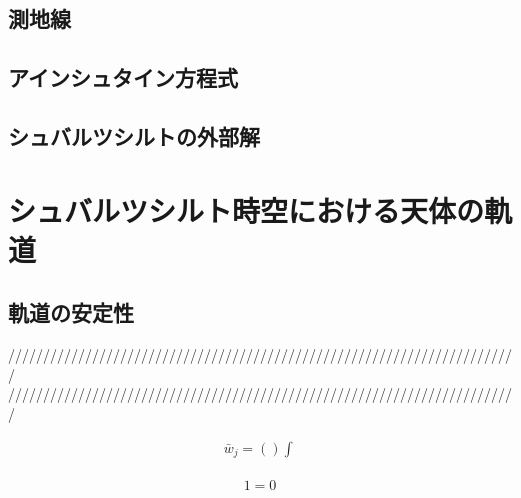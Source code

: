 \documentclass[dvipdfmx]{report} %
\begin{document}
\section{測地線}


\section{アインシュタイン方程式}


\section{シュバルツシルトの外部解}


\chapter{シュバルツシルト時空における天体の軌道}
\section{軌道の安定性}


/////////////////////////////////////////////////////////////////////////\\
/////////////////////////////////////////////////////////////////////////

\begin{equation*}
\begin{split}
	\bar{w}_j = \left( \right) \int^{}_{}
\end{split}
\end{equation*}

\begin{tcolorbox}[title=メモ用]
\begin{eqnarray*}
	1 = 0
\end{eqnarray*}
\end{tcolorbox}
\end{document}
